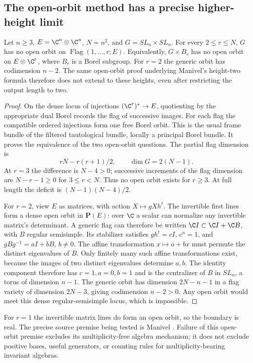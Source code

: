 \subsection{The open-orbit method has a precise higher-height limit}
\begin{finding}\label{f:sphericity}
Let $n\ge3$, $E=\C^n\otimes\C^n$, $N=n^2$, and
$G=SL_n\times SL_n$. For every $2\le r\le N$, $G$ has no
open orbit on $\operatorname{Flag}(1,\ldots,r;E)$.
Equivalently, $G\times B_r$ has no open orbit on $E\otimes\C^r$,
where $B_r$ is a Borel subgroup. For $r=2$ the generic orbit has
codimension $n-2$. The same open-orbit proof underlying Manivel's
height-two formula therefore does not extend to these heights,
even after restricting the output length to two.
\end{finding}
\begin{proof}
On the dense locus of injections $(\C^r)^*\to E$, quotienting
by the appropriate dual Borel records the flag of successive images.
For each flag the compatible ordered injections form one free Borel
orbit. This is the usual frame bundle of the filtered tautological
bundle, locally a principal Borel bundle. It proves the equivalence
of the two open-orbit questions. The partial flag dimension is
\[
 rN-r(r+1)/2,\qquad \dim G=2(N-1).
\]
At $r=3$ the difference is $N-4>0$; successive increments of the
flag dimension are $N-r-1\ge0$ for $3\le r<N$. Thus no open
orbit exists for $r\ge3$. At full length the deficit is
$(N-1)(N-4)/2$.

For $r=2$, view $E$ as matrices, with action $X\mapsto gXh^t$.
The invertible first lines form a dense open orbit in $\mathbf P(E)$:
over $\C$ a scalar can normalize any invertible matrix's determinant.
A generic flag can therefore be written
$\C I\subset\C I+\C B$, with $B$ regular semisimple.
Its stabilizer satisfies $gh^t=cI$, $c^n=1$, and
$gBg^{-1}=aI+bB$, $b\ne0$. The affine transformation
$x\mapsto a+bx$ must permute the distinct eigenvalues of $B$.
Only finitely many such affine transformations exist, because the
images of two distinct eigenvalues determine $a,b$. The identity
component therefore has $c=1,a=0,b=1$ and is the centralizer of
$B$ in $SL_n$, a torus of dimension $n-1$. The generic orbit has
dimension $2N-n-1$ in a flag variety of dimension $2N-3$,
giving codimension $n-2>0$. Any open orbit would meet this dense
regular-semisimple locus, which is impossible.
\end{proof}
For $r=1$ the invertible matrix lines do form an open orbit, so the
boundary is real. The precise source premise being tested is Manivel
\cite[Lemma~1 and Corollary~1, \S3, p.~3]{Manivel}. Failure
of this open-orbit premise excludes its multiplicity-free algebra
mechanism; it does not exclude positive bases, useful generators,
or counting rules for multiplicity-bearing invariant algebras.
